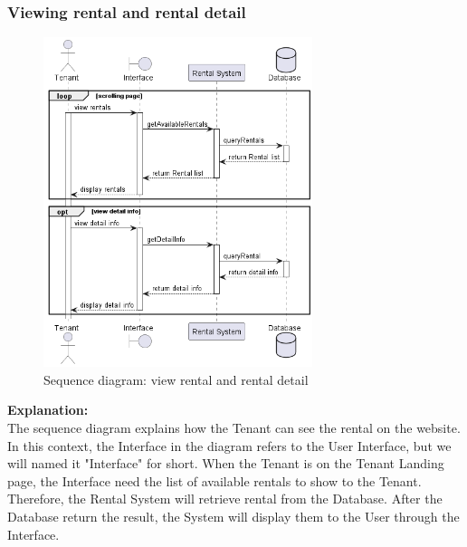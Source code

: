 \subsubsection{Viewing rental and rental detail}
\begin{figure}[H]
    \centering
    \includegraphics[width=0.7\textwidth]{Images/Sequence/seq_diag_view_rental.png}
    \caption{Sequence diagram: view rental and rental detail}
    \label{fig:seq-diag-view-rental}
\end{figure}
\noindent \textbf{Explanation:}\\
The sequence diagram explains how the Tenant can see the rental on the website. In this context, the Interface in the diagram refers to the User Interface, but we will named it "Interface" for short. When the Tenant is on the Tenant Landing page, the Interface need the list of available rentals to show to the Tenant. Therefore, the Rental System will retrieve rental from the Database. After the Database return the result, the System will display them to the User through the Interface.


\newpage
